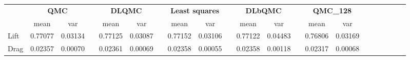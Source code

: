 \begin{tabular}{lcccccccccccccccccccc}
\toprule
 &\multicolumn{2}{c}{\textbf{QMC}}&&\multicolumn{2}{c}{\textbf{DLQMC}}&&\multicolumn{2}{c}{\textbf{Least squares}}&&\multicolumn{2}{c}{\textbf{DLbQMC}}&&\multicolumn{2}{c}{\textbf{QMC\_128}}\\ 
\cmidrule(r){2-3} \cmidrule(r){5-6} \cmidrule(r){8-9} \cmidrule(r){11-12}
 &mean&var&&mean&var&&mean&var&&mean&var&&mean&var\\ 
\midrule
Lift &0.77077&0.03134&&0.77125&0.03087&&0.77152&0.03106&&0.77122&0.04483&&0.76806&0.03169\\ 
Drag &0.02357&0.00070&&0.02361&0.00069&&0.02358&0.00055&&0.02358&0.00118&&0.02317&0.00068\\ 
\bottomrule
\end{tabular}

